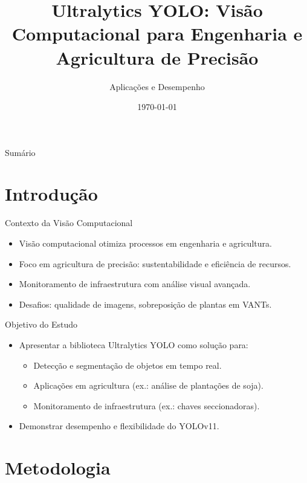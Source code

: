 \documentclass{if-beamer}
\title[Pesquisa Operacional]{Ultralytics YOLO: Visão Computacional para Engenharia e Agricultura de Precisão}
\subtitle{Aplicações e Desempenho}
\author[Haron Calegari Fanticelli]{\large \negrito{Leonardo de Andrade Santos}}
\institute[UFPR]{
    \small \textit{Universidade Federal do Paraná} \\
    \textit{Curitiba}
}
\date{\today}
\begin{document}
	
	\begin{frame}
		\titlepage
	\end{frame}
	
	\begin{frame}{Sumário}
		\tableofcontents
	\end{frame}
	
	\section{Introdução}
	
	\begin{frame}{Contexto da Visão Computacional}
		\begin{itemize}
			\item Visão computacional otimiza processos em engenharia e agricultura.
			\item Foco em agricultura de precisão: sustentabilidade e eficiência de recursos.
			\item Monitoramento de infraestrutura com análise visual avançada.
			\item Desafios: qualidade de imagens, sobreposição de plantas em VANTs.
		\end{itemize}
	\end{frame}
	
	\begin{frame}{Objetivo do Estudo}
		\begin{itemize}
			\item Apresentar a biblioteca Ultralytics YOLO como solução para:
			\begin{itemize}
				\item Detecção e segmentação de objetos em tempo real.
				\item Aplicações em agricultura (ex.: análise de plantações de soja).
				\item Monitoramento de infraestrutura (ex.: chaves seccionadoras).
			\end{itemize}
			\item Demonstrar desempenho e flexibilidade do YOLOv11.
		\end{itemize}
	\end{frame}
	
	\section{Metodologia}
	
\end{document}
